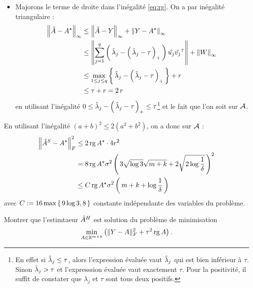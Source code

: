 \begin{sol}
\begin{itemize}[font= \color{blue} \Large, label= $\bullet$]
  \item Majorons le terme de droite dans l'inégalité \eqref{eq:rg}. On a par inégalité
        triangulaire :
        \begin{align*}
         \norme{\Aestim - \Aopt}_{\infty} & \leq \norme{\Aestim - Y}_{\infty} + \norme{Y - \Aopt}_{\infty}                                                             \\
                                          & \leq \norme{\sum_{j=1}^q \prt{\lestim_j- \prt{\lestim_j - \tau}_{+}}\hat{u_j} \transpose{\hat{v_j}} } + \norme{W}_{\infty} \\
                                          & \leq \max_{1 \leq j \leq q} \acc{\lestim_j- \prt{\lestim_j - \tau}_{+}} + r                                                \\
                                          & \leq \tau + r = 2 \, r
        \end{align*}
        en utilisant l'inégalité $0 \leq \hat{\lambda}_j- \left( \, \hat{\lambda}_j - \tau \, \right)_{+} \leq \tau $\footnote{En effet si $\hat{\lambda}_j \leq \tau$, alors l'expression évaluée vaut $\hat{\lambda}_j$ qui est bien inférieur à $\tau$. Sinon $\hat{\lambda}_j > \tau$ et l'expresssion évaluée vaut exactement $\tau$. Pour la positivité, il suffit de constater que $\lambda_j$ et $\tau$ sont tous deux positifs.} et le fait que l'on soit sur $\mathcal{A}$.
 \end{itemize}
 En utilisant l'inégalité $(a+b)^2 \leq 2 (a^2+b^2)$, on a donc sur $\mathcal{A}$ :
 \begin{align*}
  \norme{\Aestim^S - \Aopt}_F^2 & \leq 2 \rg \Aopt \cdot 4 r^2                                                                 \\
                                & = 8 \rg \Aopt \sigma^2 \prt{3 \sqrt{\log 3} \sqrt{m+k} + 2 \sqrt{2 \log \frac{1}{\delta}}}^2 \\
                                & \leq C \rg \Aopt \sigma^2 \prt{m+k+\log \frac{1}{\delta}}
 \end{align*}
 avec $C := 16 \max \left \{ \, 9 \log 3, 8 \, \right \}$ constante indépendante des variables du problème.
\end{sol}

\begin{exo}

 Montrer que l'estimtaeur $\hat{A}^H$ est solution du problème de minimisation
 \begin{equation}\label{eq:H}
  \min _ { A \in \mathbb { R } ^ { m \times k } } \left( \| Y - A \| _ { F }
  ^ { 2 } + \tau ^ { 2 } \operatorname{rg} A  \right).
 \end{equation}
\end{exo}

